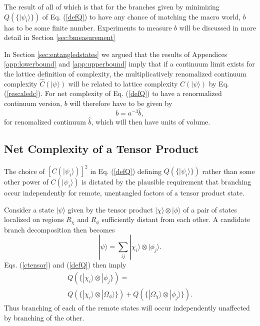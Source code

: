 \documentclass[twocolumn,amsmath,amssymb]{revtex4-1}
\begin{document}
The result of all of which is that for the branches given by minimizing $Q( \{|\psi_i \rangle \})$
of Eq. (\ref{defQ}) to 
have any chance of matching the macro world, $b$ has to be some finite
number.    Experiments to measure $b$
will be discussed in more detail in
Section \ref{sec:bmeasurement}

In Section \ref{sec:entangledstates} we argued that
the results of Appendices \ref{app:lowerbound} and \ref{app:upperbound} imply
that if a continuum limit exists for the lattice definition of complexity,
the multiplicatively renomalized continuum complexity  $\hat{C}( |\psi \rangle )$
will be related to lattice complexity $C( |\psi \rangle )$
by Eq. (\ref{rescaledc}). 
For net complexity of Eq. (\ref{defQ}) to have a renormalized continuum
version,  $b$ will therefore have to be given by
\begin{equation}
  \label{rescaledb}
  b = a^{-3} \hat{b},
\end{equation}
for renomalized continuum $\hat{b}$, which will then have units of volume.


\subsection{\label{subsec:remote} Net Complexity of a Tensor Product}


The choice of $[C( |\psi_i \rangle )]^2$ in Eq. (\ref{defQ}) defining
$Q(\{|\psi_i \rangle \})$ rather than some other power of
$C( |\psi_i \rangle )$ is dictated by the plausible requirement
that branching occur independently for remote,
unentangled factors of a tensor product state.

Consider a state $|\psi \rangle $ given by the tensor product
$|\chi \rangle  \otimes |\phi \rangle $
of a pair of states
localized on regions $R_{\chi}$ and $R_{\phi}$ sufficiently distant from each other.
A candidate branch decomposition then becomes
\begin{equation}
\label{productbranches}
|\psi \rangle  = \sum_{ij} |\chi_i \rangle  \otimes |\phi_j \rangle .
\end{equation}
Eqs. (\ref{ctensor}) and (\ref{defQ}) then imply
\begin{multline}
\label{productQ}
Q( \{|\chi_i \rangle  \otimes |\phi_j\}) = \\
Q( \{|\chi_i \rangle  \otimes |\Omega_\phi \rangle \}) + Q( \{|\Omega_\chi \rangle  \otimes |\phi_j \rangle \}).
\end{multline}
Thus branching of each of the remote states will occur independently unaffected
by branching of the other.
\end{document}
